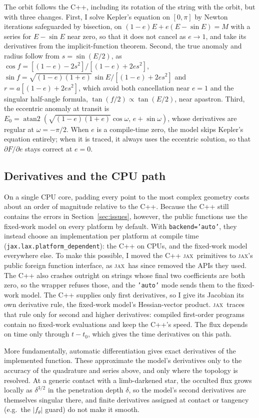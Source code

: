 \documentclass[twocolumn]{aastex701}
\newcommand{\jax}{\textsc{jax}}
\begin{document}
The orbit follows the C++, including its rotation of the string with the
orbit, but with three changes. First, I solve Kepler's equation on
$[0,\pi]$ by Newton iterations safeguarded by bisection, on
$(1-e)E + e(E-\sin E) = M$ with a series for $E-\sin E$ near zero, so that
it does not cancel as $e\to1$, and take its derivatives from the
implicit-function theorem. Second, the true anomaly and radius follow from
$s=\sin(E/2)$, as $\cos f = [(1-e)-2s^2]/[(1-e)+2e s^2]$,
$\sin f = \sqrt{(1-e)(1+e)}\,\sin E/[(1-e)+2es^2]$ and
$r=a[(1-e)+2es^2]$, which avoid both cancellation near $e=1$ and the
singular half-angle formula, $\tan(f/2) \propto \tan(E/2)$, near apastron.
Third, the eccentric anomaly at transit is
$E_0 = \operatorname{atan2}(\sqrt{(1-e)(1+e)}\cos\omega,\, e + \sin\omega)$,
whose derivatives are regular at $\omega = -\pi/2$. When $e$ is a
compile-time zero, the model skips Kepler's equation entirely; when it is
traced, it always uses the eccentric solution, so that
$\partial F/\partial e$ stays correct at $e=0$.

\subsection{Derivatives and the CPU path} \label{sec:dispatch}

On a single CPU core, padding every point to the most complex geometry
costs about an order of magnitude relative to the C++. Because the C++
still contains the errors in Section~\ref{sec:issues}, however, the
public functions use the fixed-work model on every platform by default.
With \texttt{backend='auto'}, they instead choose an implementation per
platform at compile time (\texttt{jax.lax.platform\_dependent}): the
C++ on CPUs, and the fixed-work model everywhere else. To make this
possible, I moved the C++ \jax\ primitives to \jax's public foreign
function interface, as \jax\ has since removed the APIs they used. The
C++ also crashes outright on strings whose final two coefficients are
both zero, so the wrapper refuses those, and the \texttt{'auto'} mode
sends them to the fixed-work model. The C++ supplies only first
derivatives, so I give its Jacobian its own derivative rule, the
fixed-work model's Hessian-vector product. \jax\ traces that rule only
for second and higher derivatives: compiled first-order programs contain no
fixed-work evaluations and keep the C++'s speed. The flux depends on time
only through $t-t_0$, which gives the time derivatives on this path.

More fundamentally, automatic differentiation gives exact derivatives of
the implemented function. These approximate the model's derivatives only
to the accuracy of the quadrature and series above, and only where the
topology is resolved. At a generic contact with a limb-darkened star, the occulted
flux grows locally as $\delta^{3/2}$ in the penetration depth $\delta$,
so the model's second derivatives are themselves singular there, and
finite derivatives assigned at contact or tangency (e.g.\ the
$|f_\theta|$ guard) do not make it smooth.
\end{document}
